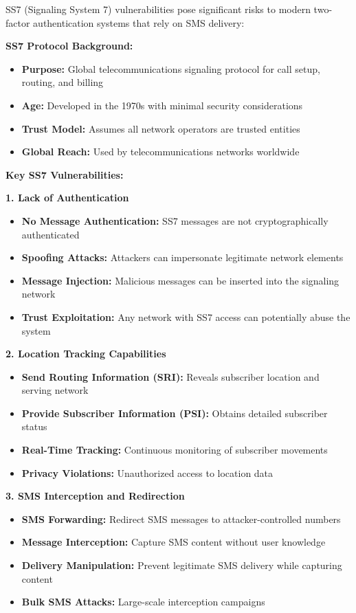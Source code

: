 \documentclass[12pt,a4paper]{article}
\begin{document}
SS7 (Signaling System 7) vulnerabilities pose significant risks to modern two-factor authentication systems that rely on SMS delivery:

\textbf{SS7 Protocol Background:}
\begin{itemize}
    \item \textbf{Purpose:} Global telecommunications signaling protocol for call setup, routing, and billing
    \item \textbf{Age:} Developed in the 1970s with minimal security considerations
    \item \textbf{Trust Model:} Assumes all network operators are trusted entities
    \item \textbf{Global Reach:} Used by telecommunications networks worldwide
\end{itemize}

\textbf{Key SS7 Vulnerabilities:}

\textbf{1. Lack of Authentication}
\begin{itemize}
    \item \textbf{No Message Authentication:} SS7 messages are not cryptographically authenticated
    \item \textbf{Spoofing Attacks:} Attackers can impersonate legitimate network elements
    \item \textbf{Message Injection:} Malicious messages can be inserted into the signaling network
    \item \textbf{Trust Exploitation:} Any network with SS7 access can potentially abuse the system
\end{itemize}

\textbf{2. Location Tracking Capabilities}
\begin{itemize}
    \item \textbf{Send Routing Information (SRI):} Reveals subscriber location and serving network
    \item \textbf{Provide Subscriber Information (PSI):} Obtains detailed subscriber status
    \item \textbf{Real-Time Tracking:} Continuous monitoring of subscriber movements
    \item \textbf{Privacy Violations:} Unauthorized access to location data
\end{itemize}

\textbf{3. SMS Interception and Redirection}
\begin{itemize}
    \item \textbf{SMS Forwarding:} Redirect SMS messages to attacker-controlled numbers
    \item \textbf{Message Interception:} Capture SMS content without user knowledge
    \item \textbf{Delivery Manipulation:} Prevent legitimate SMS delivery while capturing content
    \item \textbf{Bulk SMS Attacks:} Large-scale interception campaigns
\end{itemize}
\end{document}
